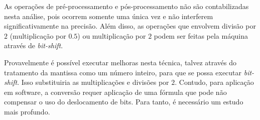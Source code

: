 	As operações de pré-processamento e pós-processamento não são contabilizadas nesta análise, pois ocorrem somente uma
	única vez e não interferem significativamente na precisão. Além disso, as operações que envolvem divisão por $2$ (multiplicação por $0.5$) ou multiplicação por $2$
	podem ser feitas pela máquina através de \textit{bit-shift}.

	Provavelmente é possível executar melhoras nesta técnica, talvez através do tratamento da mantissa
	como um número inteiro, para que se possa executar \textit{bit-shift}. Isso substituiria as multiplicações e
	divisões por $2$. Contudo, para aplicação em software, a conversão requer aplicação de uma fórmula que pode não compensar o uso do deslocamento de bits.
	Para tanto, é necessário um estudo mais profundo.


